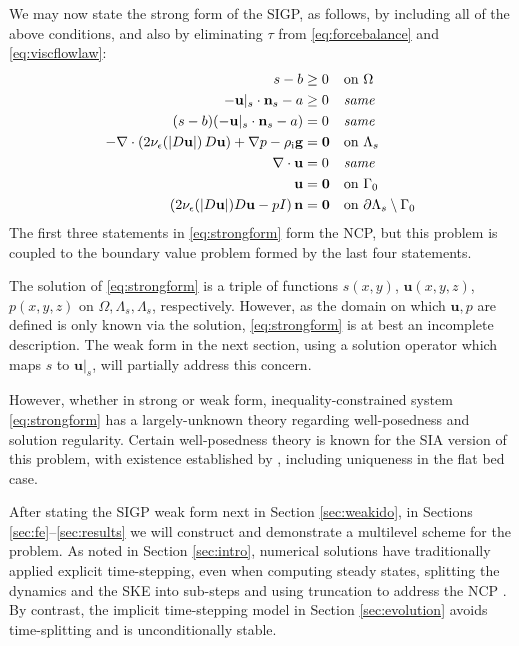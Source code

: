 \documentclass[letterpaper,final,12pt,reqno]{amsart}
\theoremstyle{claim}
\newcommand{\eps}{\epsilon}
\newcommand{\bn}{\mathbf{n}}
\newcommand{\bu}{\mathbf{u}}
\newcommand{\bzero}{\bm{0}}
\newcommand{\rhoi}{\rho_{\text{i}}}
\numberwithin{equation}{section}
\numberwithin{figure}{section}
\numberwithin{table}{section}
\numberwithin{theorem}{section}
\begin{document}
We may now state the strong form of the SIGP, as follows, by including all of the above conditions, and also by eliminating $\tau$ from \eqref{eq:forcebalance} and \eqref{eq:viscflowlaw}:
\begin{align}
s - b &\ge 0 && \text{on $\Omega$} \label{eq:strongform} \\
- \bu|_s \cdot \bn_s - a &\ge 0 && \text{\emph{same}} \notag \\
(s - b) (- \bu|_s \cdot \bn_s - a) &= 0 && \text{\emph{same}} \notag \\
- \nabla \cdot \left(2 \nu_\eps(|D\bu|)\, D\bu\right) + \nabla p - \rhoi \mathbf{g} &= \bzero && \text{on $\Lambda_s$} \notag \\
\nabla \cdot \bu &= 0 && \text{\emph{same}} \notag \\
\bu &= \bzero && \text{on $\Gamma_0$} \notag \\
\left(2 \nu_\eps(|D\bu|) D\bu - pI\right) \bn &= \bzero && \text{on $\partial \Lambda_s \setminus \Gamma_0$} \notag
\end{align}
The first three statements in \eqref{eq:strongform} form the NCP, but this problem is coupled to the boundary value problem formed by the last four statements.

The solution of \eqref{eq:strongform} is a triple of functions $s(x,y)$, $\bu(x,y,z)$, $p(x,y,z)$ on $\Omega,\Lambda_s,\Lambda_s$, respectively.  However, as the domain on which $\bu,p$ are defined is only known via the solution, \eqref{eq:strongform} is at best an incomplete description.  The weak form in the next section, using a solution operator which maps $s$ to $\bu|_s$, will partially address this concern.

However, whether in strong or weak form, inequality-constrained system \eqref{eq:strongform} has a largely-unknown theory regarding well-posedness and solution regularity.  Certain well-posedness theory is known for the SIA version of this problem, with existence established by \cite{JouvetBueler2012}, including uniqueness in the flat bed case.

After stating the SIGP weak form next in Section \ref{sec:weakido}, in Sections \ref{sec:fe}--\ref{sec:results} we will construct and demonstrate a multilevel scheme for the problem.  As noted in Section \ref{sec:intro}, numerical solutions have traditionally applied explicit time-stepping, even when computing steady states, splitting the dynamics and the SKE into sub-steps and using truncation to address the NCP \cite[for example]{Jouvetetal2008,Lengetal2012}.  By contrast, the implicit time-stepping model in Section \ref{sec:evolution} avoids time-splitting and is unconditionally stable.
\end{document}
